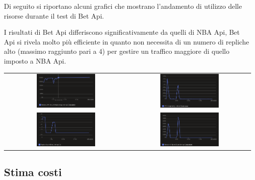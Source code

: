 Di seguito si riportano alcuni grafici che mostrano l'andamento di utilizzo delle risorse durante il test di Bet Api.

I risultati di Bet Api differiscono significativamente da quelli di NBA Api, Bet Api si rivela molto più efficiente in quanto non necessita di un numero di repliche alto (massimo raggiunto pari a 4) per gestire un traffico maggiore di quello imposto a NBA Api.

\begin{tabular}{ c c }
    \includegraphics[width=0.5\textwidth]{img/load_test/bet-api-mem-avg.png} & \includegraphics[width=0.5\textwidth]{img/load_test/bet-api-cpu-avg.png} \\
    \includegraphics[width=0.5\textwidth]{img/load_test/bet-api-rep-count.png} & \includegraphics[width=0.5\textwidth]{img/load_test/bet-api-rx-sum.png} \\
\end{tabular}


\subsection{Stima costi}

















